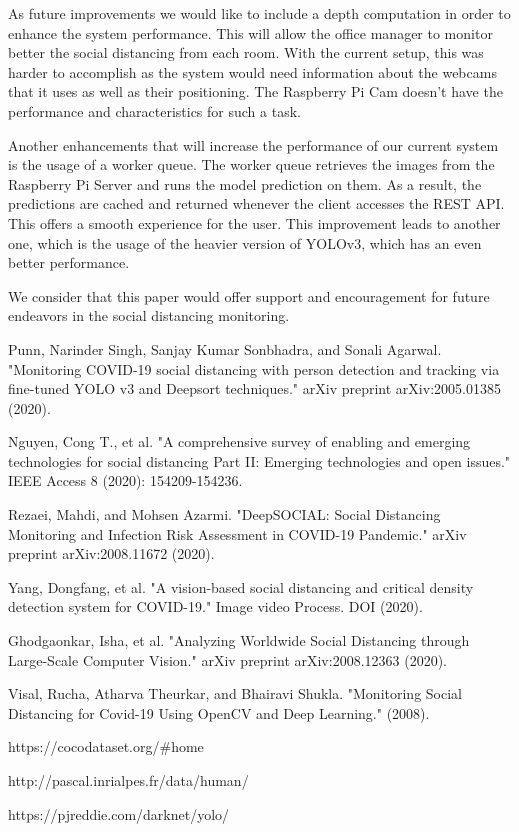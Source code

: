 \documentclass[runningheads,a4paper,11pt]{report}
\begin{document}
As future improvements we would like to include a depth computation in order to enhance the system performance. This will allow the office manager to monitor better the social distancing from each room. With the current setup, this was harder to accomplish as the system would need information about the webcams that it uses as well as their positioning. The Raspberry Pi Cam doesn't have the performance and characteristics for such a task.

Another enhancements that will increase the performance of our current system is the usage of a worker queue. The worker queue retrieves the images from the Raspberry Pi Server and runs the model prediction on them. As a result, the predictions are cached and returned whenever the client accesses the REST API. This offers a smooth experience for the user. This improvement leads to another one, which is the usage of the heavier version of YOLOv3, which has an even better performance. 

We consider that this paper would offer support and encouragement for future endeavors in the social distancing monitoring.



\begin{thebibliography}{1}
    Punn, Narinder Singh, Sanjay Kumar Sonbhadra, and Sonali Agarwal. "Monitoring COVID-19 social distancing with person detection and tracking via fine-tuned YOLO v3 and Deepsort techniques." arXiv preprint arXiv:2005.01385 (2020).
    
     Nguyen, Cong T., et al. "A comprehensive survey of enabling and emerging technologies for social distancing Part II: Emerging technologies and open issues." IEEE Access 8 (2020): 154209-154236.
    
    Rezaei, Mahdi, and Mohsen Azarmi. "DeepSOCIAL: Social Distancing Monitoring and Infection Risk Assessment in COVID-19 Pandemic." arXiv preprint arXiv:2008.11672 (2020).
    
     Yang, Dongfang, et al. "A vision-based social distancing and critical density detection system for COVID-19." Image video Process. DOI (2020).
    
     Ghodgaonkar, Isha, et al. "Analyzing Worldwide Social Distancing through Large-Scale Computer Vision." arXiv preprint arXiv:2008.12363 (2020).

     Visal, Rucha, Atharva Theurkar, and Bhairavi Shukla. "Monitoring Social Distancing for Covid-19 Using OpenCV and Deep Learning." (2008).
    
     https://cocodataset.org/\#home
    
     http://pascal.inrialpes.fr/data/human/
    
     https://pjreddie.com/darknet/yolo/
    
\end{thebibliography}
\end{document}
